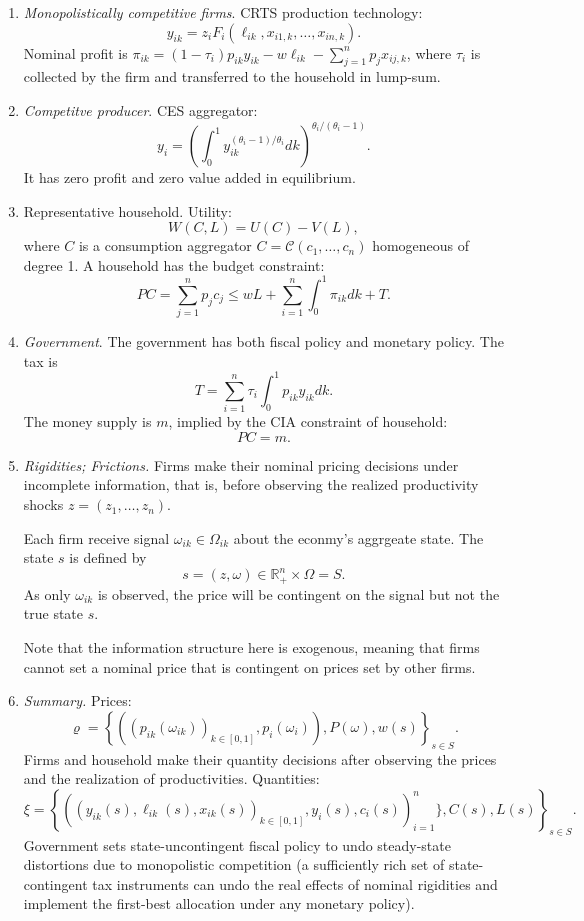 \documentclass[12pt]{article}
\numberwithin{equation}{section}
\begin{document}
\begin{enumerate}
    \item \textit{Monopolistically competitive firms}. CRTS production technology:
    \[y_{ik} = z_i F_i(\ell_{ik}, x_{i1,k}, \dots, x_{in,k}).\]
    Nominal profit is $\pi_{ik} = (1-\tau_i)p_{ik} y_{ik} - w \ell_{ik} - \sum_{j=1}^n p_{j} x_{ij,k}$, where $\tau_i$ is collected by the firm and transferred to the household in lump-sum.

    \item \textit{Competitve producer}. CES aggregator:
    \[y_i = \left(\int^1_0 y_{ik}^{(\theta_i-1)/{\theta_i}} dk\right)^{{\theta_i}/(\theta_i - 1)}.\]
    It has zero profit and zero value added in equilibrium.

    \item Representative household. Utility:
    \[W(C,L) = U(C) - V(L),\]
    where $C$ is a consumption aggregator $C = \mathcal{C}(c_1, \dots, c_n)$ homogeneous of degree 1. A household has the budget constraint:
    \[ PC = \sum_{j=1}^n p_j c_j \leq wL + \sum_{i=1}^n \int_0^1 \pi_{ik} dk + T.\]
    
    \item \textit{Government}. The government has both fiscal policy and monetary policy. The tax is
    \[T = \sum_{i=1}^n \tau_i \int_0^1 p_{ik} y_{ik} dk.\]
    The money supply is $m$, implied by the CIA constraint of household:
    \[PC = m.\]

    \item \textit{Rigidities; Frictions.} Firms make their nominal pricing decisions under incomplete information, that is, before observing the realized productivity shocks $z = (z_1, \dots, z_n)$.
    
    Each firm receive signal $\omega_{ik} \in \Omega_{ik}$ about the econmy's aggrgeate state. The state $s$ is defined by
    \[ s = (z, \omega) \in \mathbb{R}^n_+ \times \Omega = S. \]
    As only $\omega_{ik}$ is observed, the price will be contingent on the signal but not the true state $s$.

    Note that the information structure here is exogenous, meaning that firms cannot set a nominal price that is contingent on prices set by other firms.

    \item \textit{Summary.} Prices:
    \[\varrho = \left\{\left(\left(p_{ik}(\omega_{ik})\right)_{k\in[0,1]}, p_i(\omega_i)\right), P(\omega), w(s)\right\}_{s\in S}.\]
    Firms and household make their quantity decisions after observing the prices and the realization of productivities. Quantities:
    \[\xi = \left\{\left(\left(y_{ik}(s), \ell_{ik}(s), x_{ik}(s)\right)_{k\in[0,1]}, y_i(s), c_i(s)\right)_{i=1}^n\}, C(s), L(s)\right\}_{s\in S}.\]
    Government sets state-uncontingent fiscal policy to undo steady-state distortions due to monopolistic competition (a sufficiently rich set of state-contingent tax instruments can undo the real effects of nominal rigidities and implement the first-best allocation under any monetary policy). 
    

\end{enumerate}
\end{document}
